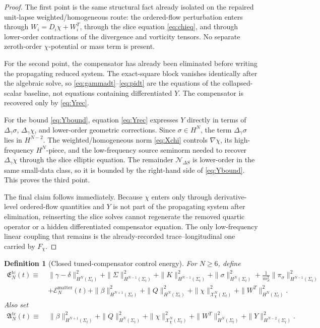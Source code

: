 \documentclass[11pt]{article}
\newtheorem{definition}{Definition}
\begin{document}
\begin{proof}
The first point is the same structural fact already isolated on the repaired unit-lapse weighted/homogeneous route: the ordered-flow perturbation enters through \(W_i=D_i\chi+W_i^T\), through the slice equation \eqref{eq:chieq}, and through lower-order contractions of the divergence and vorticity tensors. No separate zeroth-order \(\chi\)-potential or mass term is present.

For the second point, the compensator has already been eliminated before writing the propagating reduced system. The exact-square block vanishes identically after the algebraic solve, so \eqref{eq:gammadt}--\eqref{eq:pidt} are the equations of the collapsed-scalar baseline, not equations containing differentiated \(Y\). The compensator is recovered only by \eqref{eq:Yrec}.

For the bound \eqref{eq:Ybound}, equation \eqref{eq:Yrec} expresses \(Y\) directly in terms of \(\Delta_\gamma\sigma\), \(\Delta_\gamma\chi\), and lower-order geometric corrections. Since \(\sigma\in H^N\), the term \(\Delta_\gamma\sigma\) lies in \(H^{N-2}\). The weighted/homogeneous norm \eqref{eq:Xchi} controls \(\nabla\chi\), its high-frequency \(H^N\)-piece, and the low-frequency source seminorm needed to recover \(\Delta_\gamma\chi\) through the slice elliptic equation. The remainder \(\mathcal N_{\Delta S}\) is lower-order in the same small-data class, so it is bounded by the right-hand side of \eqref{eq:Ybound}. This proves the third point.

The final claim follows immediately. Because \(\chi\) enters only through derivative-level ordered-flow quantities and \(Y\) is not part of the propagating system after elimination, reinserting the slice solves cannot regenerate the removed quartic operator or a hidden differentiated compensator equation. The only low-frequency linear coupling that remains is the already-recorded trace--longitudinal one carried by \(F_\chi\).
\end{proof}

\begin{definition}[Closed tuned-compensator control energy]
\label{def:Etc}
For \(N\ge 6\), define
\begin{align}
\mathfrak E_N^{\mathrm{tc}}(t)
\equiv\;&
\|\gamma-\delta\|_{H^N(\Sigma_t)}^2
+\|\Sigma\|_{H^{N-1}(\Sigma_t)}^2
+\|K\|_{H^{N-1}(\Sigma_t)}^2
+\|\sigma\|_{H^N(\Sigma_t)}^2
+\frac{1}{m_S^2}\|\pi_\sigma\|_{H^{N-1}(\Sigma_t)}^2
\nonumber\\
&+\mathcal E_N^{\mathrm{matter}}(t)
+\|\beta\|_{H^{N+1}(\Sigma_t)}^2
+\|Q\|_{H^N(\Sigma_t)}^2
+\|\chi\|_{\mathcal X_\chi^N(\Sigma_t)}^2
+\|W^T\|_{H^N(\Sigma_t)}^2.
\label{eq:Etc}
\end{align}
Also set
\begin{align}
\mathfrak A_N^{\mathrm{tc}}(t)
\equiv\;&
\|\beta\|_{H^{N+1}(\Sigma_t)}^2
+\|Q\|_{H^N(\Sigma_t)}^2
+\|\chi\|_{\mathcal X_\chi^N(\Sigma_t)}^2
+\|W^T\|_{H^N(\Sigma_t)}^2
+\|Y\|_{H^{N-2}(\Sigma_t)}^2.
\label{eq:Atc}
\end{align}
\end{definition}
\end{document}
